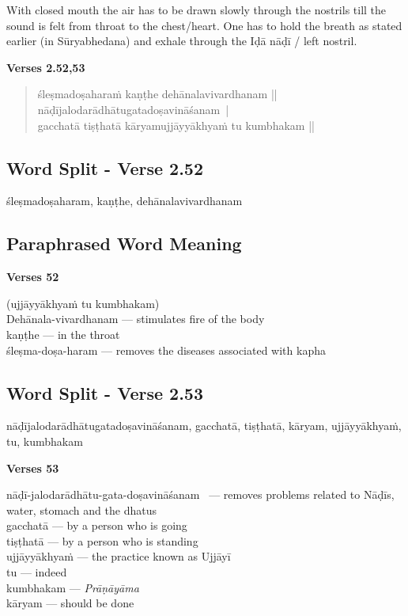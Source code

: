 With closed mouth the air has to be drawn slowly through the nostrils till the sound is felt from throat to the chest/heart. One has to hold the breath as stated earlier (in Sūryabhedana) and exhale through the Iḍā nāḍī / left nostril.    
\newpage


\noindent \textbf{Verses 2.52,53}

\begin{verse}
śleṣmadoṣaharaṁ kaṇṭhe dehānalavivardhanam ||\\
nāḍījalodarādhātugatadoṣavināśanam |\\
gacchatā tiṣṭhatā kāryamujjāyyākhyaṁ tu kumbhakam ||
\end{verse}

\subsection*{Word Split - Verse 2.52}

śleṣmadoṣaharam, kaṇṭhe, dehānalavivardhanam 

\subsection*{Paraphrased Word Meaning}

\noindent \textbf{Verses 52}

\begin{multicols}{2}
(ujjāyyākhyaṁ tu kumbhakam)\\
Dehānala-vivardhanam --- stimulates fire of the body \\
kaṇṭhe --- in the throat  \\
śleṣma-doṣa-haram --- removes the diseases associated with kapha 
\end{multicols}

\subsection*{Word Split - Verse 2.53}

nāḍījalodarādhātugatadoṣavināśanam, gacchatā, tiṣṭhatā, kāryam, ujjāyyākhyaṁ, tu, kumbhakam

\noindent \textbf{Verses 53}

\begin{multicols}{2}
nāḍī-jalodarādhātu-gata-doṣavi\-nāśanam  --- removes problems related to Nāḍīs, water, stomach and the dhatus\\
gacchatā --- by a person who is going \\
tiṣṭhatā --- by a person who is standing \\
ujjāyyākhyaṁ --- the practice known as Ujjāyī\\
tu --- indeed \\
kumbhakam --- \textit{Prāṇāyāma} \\
kāryam --- should be done
\end{multicols}

